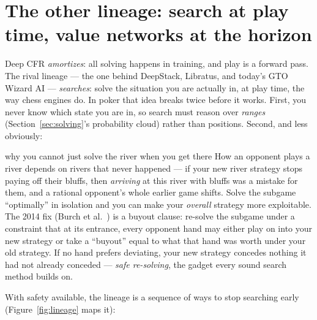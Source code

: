 \section{The other lineage: search at play time, value networks at the horizon}\label{sec:search}

Deep CFR \emph{amortizes}: all solving happens in training, and play is a forward pass. The rival lineage --- the one behind DeepStack, Libratus, and today's GTO Wizard AI --- \emph{searches}: solve the situation you are actually in, at play time, the way chess engines do. In poker that idea breaks twice before it works. First, you never know which state you are in, so search must reason over \emph{ranges} (Section~\ref{sec:solving}'s probability cloud) rather than positions. Second, and less obviously:

\begin{intuition}{why you cannot just solve the river when you get there}
How an opponent plays a river depends on rivers that never happened --- if your new river strategy stops paying off their bluffs, then \emph{arriving} at this river with bluffs was a mistake for them, and a rational opponent's whole earlier game shifts. Solve the subgame ``optimally'' in isolation and you can make your \emph{overall} strategy more exploitable. The 2014 fix (Burch et al.~\cite{burch2014}) is a buyout clause: re-solve the subgame under a constraint that at its entrance, every opponent hand may either play on into your new strategy or take a ``buyout'' equal to what that hand was worth under your old strategy. If no hand prefers deviating, your new strategy concedes nothing it had not already conceded --- \emph{safe re-solving}, the gadget every sound search method builds on.
\end{intuition}

With safety available, the lineage is a sequence of ways to stop searching early (Figure~\ref{fig:lineage} maps it):

